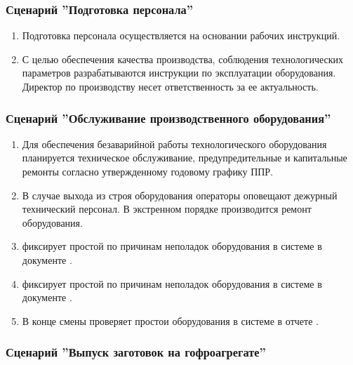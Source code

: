 \subsubsection{Сценарий ''Подготовка персонала''}
\label{bp:production_7}

\begin{enumerate}
\item Подготовка персонала осуществляется на основании рабочих инструкций.
\item 	С целью обеспечения качества производства, соблюдения технологических параметров разрабатываются инструкции по эксплуатации оборудования. Директор по производству несет ответственность за ее актуальность.


\end{enumerate}

\subsubsection{Сценарий ''Обслуживание производственного оборудования''}
\label{bp:production_8}

\begin{enumerate}
\item 	Для обеспечения безаварийной работы технологического оборудования планируется техническое обслуживание, предупредительные и капитальные ремонты согласно утвержденному годовому графику ППР.
\item 	В случае выхода из строя оборудования операторы оповещают дежурный технический персонал. В экстренном порядке производится ремонт оборудования. 
\item 	\gaoperator фиксирует простой по причинам неполадок оборудования в системе \gofro в документе .
\item 	\operator фиксирует простой по причинам неполадок оборудования в системе \gofro в документе .
\item 	В конце смены \master проверяет простои оборудования в системе \gofro в отчете .


\end{enumerate}





\subsubsection{Сценарий ''Выпуск заготовок на гофроагрегате''}
\label{bp:production_9}

